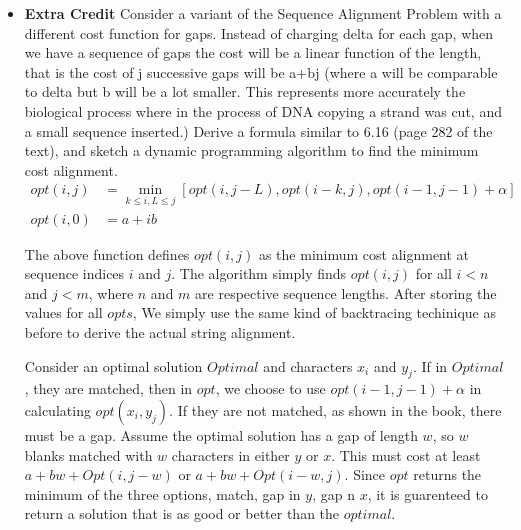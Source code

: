 \documentclass[a4paper]{article}
\begin{document}
\begin{itemize}
\item{\textbf{Extra Credit}} Consider a variant of the Sequence Alignment Problem with a different cost function for gaps. 
Instead of charging delta for each gap, when we have a sequence of gaps the cost will be a linear function of the length, that is the cost of j successive gaps will be a+bj (where a will be comparable to delta but b will be a lot smaller. This represents more accurately the biological process where in the process of DNA copying a strand was cut, and a small sequence inserted.)
Derive a formula similar to 6.16 (page 282 of the text), and sketch a dynamic programming algorithm to find the minimum cost alignment.
\begin{align*}
opt(i,j) &= \min_{k\leq i, L \leq j}[opt(i, j-L), opt(i-k, j), opt(i-1, j-1) + \alpha] \\
opt(i, 0) &= a+ib
\end{align*}

The above function defines $opt(i,j)$ as the minimum cost alignment at sequence indices $i$ and $j$. The algorithm simply finds $opt(i,j)$ for all $i < n$ and $j < m$, where $n$ and $m$ are respective sequence lengths. After storing the values for all $opts$, We simply use the same kind of backtracing techinique as before to derive the actual string alignment.

Consider an optimal solution $Optimal$ and characters $x_i$ and $y_j$. If in $Optimal$, they are matched, then in $opt$, we choose to use $opt(i-1, j-1) + \alpha$ in calculating $opt(x_i, y_j)$. If they are not matched, as shown in the book, there must be a gap. Assume the optimal solution has a gap of length $w$, so $w$ blanks matched with $w$ characters in either $y$ or $x$. This must cost at least $a + bw + Opt(i, j-w)$ or $a + bw + Opt(i-w, j)$. Since $opt$ returns the minimum of the three options, match, gap in $y$, gap n $x$, it is guarenteed to return a solution that is as good or better than the $optimal$.
\end{itemize}
\end{document}
